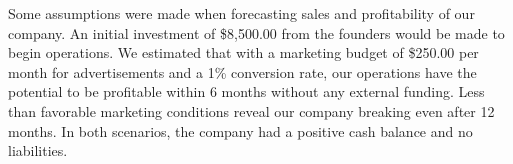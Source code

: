 Some assumptions were made when forecasting sales and profitability of our company. An initial investment of \$8,500.00 from the founders would be made to begin operations. We estimated that with a marketing budget of \$250.00 per month for advertisements and a 1\% conversion rate, our operations have the potential to be profitable within 6 months without any external funding. Less than favorable marketing conditions reveal our company breaking even after 12 months. In both scenarios, the company had a positive cash balance and no liabilities.





